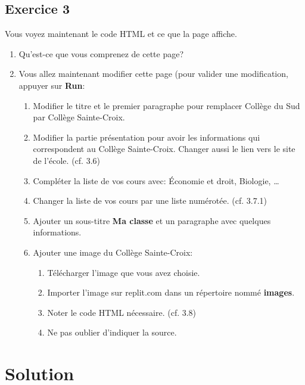 \documentclass[a4paper,11pt]{article}
\begin{document}
\subsection{Exercice 3}
Vous voyez maintenant le code HTML et ce que la page affiche.
\begin{enumerate}[label=\arabic*)]
\item Qu'est-ce que vous comprenez de cette page?
\item Vous allez maintenant modifier cette page (pour valider une modification, appuyer sur \textbf{Run}:
\begin{enumerate}
  \item Modifier le titre et le premier paragraphe pour remplacer Collège du Sud par Collège Sainte-Croix.
  \item Modifier la partie présentation pour avoir les informations qui correspondent au Collège Sainte-Croix. Changer aussi le lien vers le site de l'école. (cf. 3.6)
  \item Compléter la liste de vos cours avec: Économie et droit, Biologie, \dots
  \item Changer la liste de vos cours par une liste numérotée. (cf. 3.7.1)
  \item Ajouter un sous-titre \textbf{Ma classe} et un paragraphe avec quelques informations.
  \item Ajouter une image du Collège Sainte-Croix:
\begin{enumerate}[label=\roman*.]
    \item Télécharger l'image que vous avez choisie.
    \item Importer l'image sur replit.com dans un répertoire nommé \textbf{images}.
    \item Noter le code HTML nécessaire. (cf. 3.8)
  \item Ne pas oublier d'indiquer la source.
\end{enumerate}
\end{enumerate}
\end{enumerate}

\section{Solution}

\end{document}
